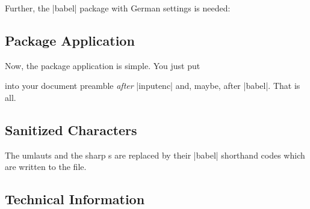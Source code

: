 \documentclass[a4paper,11pt]{ltxdoc}
\begin{document}

Further, the |babel| package with German settings is needed:

\begin{dispListing}
\usepackage[ngerman]{babel}
\end{dispListing}

\subsection{Package Application}
Now, the package application is simple. You just put

\begin{dispListing}
\usepackage{sanitize-umlaut}
\end{dispListing}

into your document preamble \emph{after} |inputenc| and, maybe, after |babel|.
That is all.


\subsection{Sanitized Characters}

The umlauts and the sharp s are replaced by their |babel| shorthand codes
which are written to the  file.



\subsection{Technical Information}
\end{document}
